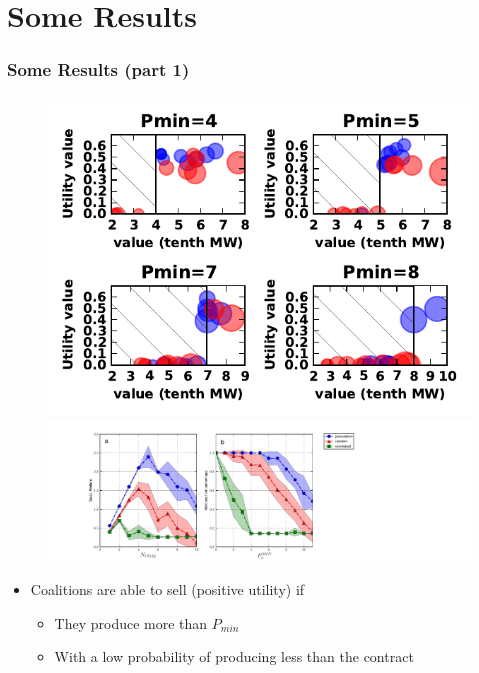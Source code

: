 \documentclass[xcolor=dvipsnames]{beamer}
\begin{document}
\begin{frame}
\end{frame}

%
%
\section{Some Results}
\begin{frame}
	\frametitle{Some Results (part 1)}
	
	\begin{figure}
		\includegraphics[scale=.5]{coals.pdf}
		\includegraphics[scale=.3]{fig8.pdf}
	\end{figure}

	\begin{itemize}
		\item {\small Coalitions are able to sell (positive utility) if }
			\begin{itemize}
				\item {\footnotesize They produce more than $ P_{min} $}
				\item {\footnotesize With a low probability of producing less than the contract}
			\end{itemize}
	\end{itemize}

\end{frame}
\end{document}
